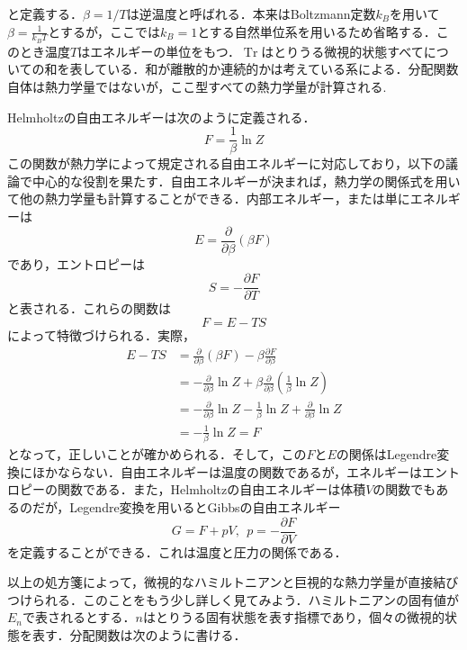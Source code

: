 \documentclass[a4paper,11pt]{jsarticle}
\begin{document}
と定義する．$\beta=1/T$は逆温度と呼ばれる．本来はBoltzmann定数$k_B$を用いて$\beta=\frac{1}{k_B T}$とするが，ここでは$k_B=1$とする自然単位系を用いるため省略する．このとき温度$T$はエネルギーの単位をもつ．$\operatorname{Tr}$はとりうる微視的状態すべてについての和を表している．和が離散的か連続的かは考えている系による．分配関数自体は熱力学量ではないが，ここ型すべての熱力学量が計算される.\par
Helmholtzの自由エネルギーは次のように定義される．
\begin{equation}
  F = \frac{1}{\beta}\ln{Z}
\end{equation}
この関数が熱力学によって規定される自由エネルギーに対応しており，以下の議論で中心的な役割を果たす．自由エネルギーが決まれば，熱力学の関係式を用いて他の熱力学量も計算することができる．内部エネルギー，または単にエネルギーは
\begin{equation}
  E = \frac{\partial}{\partial \beta}(\beta F)
\end{equation}
であり，エントロピーは
\begin{equation}
  S = -\frac{\partial F}{\partial T}
\end{equation}
と表される．これらの関数は
\begin{equation}
  F = E -TS
\end{equation}
によって特徴づけられる．実際，
\begin{align*}
  E - TS
   & = \frac{\partial}{\partial \beta}(\beta F) - \beta \frac{\partial F}{\partial \beta}                                  \\
   & = -\frac{\partial}{\partial \beta} \ln{Z} + \beta \frac{\partial}{\partial \beta}\left( \frac{1}{\beta}\ln{Z} \right) \\
   & = -\frac{\partial}{\partial \beta} \ln{Z} - \frac{1}{\beta} \ln{Z} + \frac{\partial}{\partial \beta} \ln{Z}           \\
   & = - \frac{1}{\beta} \ln{Z} = F
\end{align*}
となって，正しいことが確かめられる．そして，この$F$と$E$の関係はLegendre変換にほかならない．自由エネルギーは温度の関数であるが，エネルギーはエントロピーの関数である．また，Helmholtzの自由エネルギーは体積$V$の関数でもあるのだが，Legendre変換を用いるとGibbsの自由エネルギー
\begin{equation}
  G = F + pV, \ \ p = -\frac{\partial F}{\partial V}
\end{equation}
を定義することができる．これは温度と圧力の関係である．\par
以上の処方箋によって，微視的なハミルトニアンと巨視的な熱力学量が直接結びつけられる．このことをもう少し詳しく見てみよう．ハミルトニアンの固有値が$E_n$で表されるとする．$n$はとりうる固有状態を表す指標であり，個々の微視的状態を表す．分配関数は次のように書ける．
\end{document}

